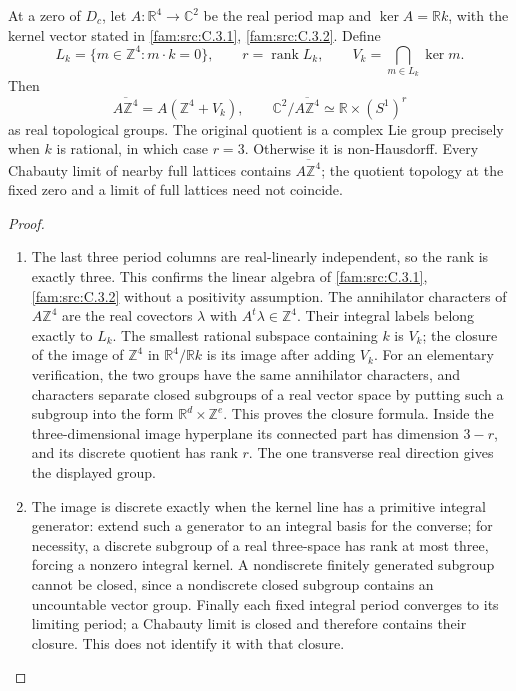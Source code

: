 \begin{proposition}\hypertarget{tag-032L}{}\label{push:src:D.4.3}

At a zero of \(D_c\), let \(A:\mathbb R^4\to\mathbb C^2\) be
the real period map and \(\ker A=\mathbb R k\), with the kernel
vector stated in \cref{fam:src:C.3.1}, \cref{fam:src:C.3.2}. Define
\[
 L_k=\{m\in\mathbb Z^4:m\cdot k=0\},\qquad r=\operatorname{rank}L_k,
 \qquad V_k=\bigcap_{m\in L_k}\ker m.
\]
Then
\[
 \overline{A\mathbb Z^4}=A(\mathbb Z^4+V_k),\qquad
 \mathbb C^2/\overline{A\mathbb Z^4}\simeq
                         \mathbb R\times(S^1)^r
\]
as real topological groups. The original quotient is a complex Lie
group precisely when \(k\) is rational, in which case \(r=3\).
Otherwise it is non-Hausdorff. Every Chabauty limit of nearby full
lattices contains \(\overline{A\mathbb Z^4}\); the quotient topology
at the fixed zero and a limit of full lattices need not coincide.
\end{proposition}


\begin{proof}
\begin{enumerate}[label=\arabic*.,leftmargin=*]
\item The last three period columns are real-linearly independent, so the
rank is exactly three. This confirms the linear algebra of \cref{fam:src:C.3.1}, \cref{fam:src:C.3.2}
without a positivity assumption. The annihilator characters of
\(A\mathbb Z^4\) are the real covectors \(\lambda\) with
\(A^t\lambda\in\mathbb Z^4\). Their integral labels belong exactly
to \(L_k\). The smallest rational subspace containing \(k\) is
\(V_k\); the closure of the image of \(\mathbb Z^4\) in
\(\mathbb R^4/\mathbb R k\) is its image after adding \(V_k\).
For an elementary verification, the two groups have the same
annihilator characters, and characters separate closed subgroups of
a real vector space by putting such a subgroup into the form
\(\mathbb R^d\times\mathbb Z^e\). This proves the closure formula.
Inside the three-dimensional image hyperplane its connected part
has dimension \(3-r\), and its discrete quotient has rank \(r\).
The one transverse real direction gives the displayed group.

\item The image is discrete exactly when the kernel line has a primitive
integral generator: extend such a generator to an integral basis for
the converse; for necessity, a discrete subgroup of a real
three-space has rank at most three, forcing a nonzero integral
kernel. A nondiscrete finitely generated subgroup cannot be closed,
since a nondiscrete closed subgroup contains an uncountable vector
group. Finally each fixed integral period converges to its limiting
period; a Chabauty limit is closed and therefore contains their
closure. This does not identify it with that closure.
\end{enumerate}
\end{proof}
